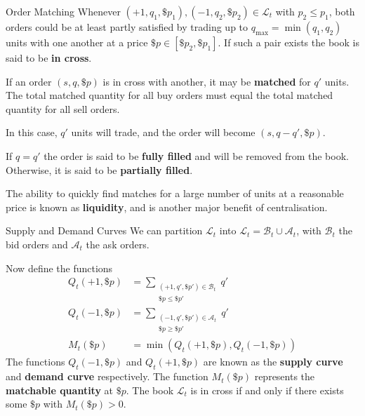 \documentclass{beamer}
\begin{document}
\begin{frame}{Order Matching}
	Whenever $(+1,q_1,\$p_1), (-1,q_2,\$p_2)\in\mathcal{L}_t$ with $p_2\leq p_1$, both orders could be at least partly satisfied by trading up to $q_{\max}=\min(q_1,q_2)$ units with one another at a price $\$p\in[\$p_2,\$p_1]$. If such a pair exists the book is said to be \textbf{in cross}.

	\pause

	If an order $(s,q,\$p)$ is in cross with another, it may be \textbf{matched} for $q'$ units. The total matched quantity for all buy orders must equal the total matched quantity for all sell orders.

	\pause

	In this case, $q'$ units will trade, and the order will become $(s,q-q',\$p)$.

	\pause

	If $q=q'$ the order is said to be \textbf{fully filled} and will be removed from the book. Otherwise, it is said to be \textbf{partially filled}.

	\pause
	The ability to quickly find matches for a large number of units at a reasonable price is known as \textbf{liquidity}, and is another major benefit of centralisation.
\end{frame}

\begin{frame}{Supply and Demand Curves}
	We can partition $\mathcal{L}_t$ into $\mathcal{L}_t = \mathcal{B}_t\cup\mathcal{A}_t$, with $\mathcal{B}_t$ the bid orders and $\mathcal{A}_t$ the ask orders.

	\pause

	Now define the functions
	\begin{align*}
		Q_t(+1,\$p)	&= \sum_{\substack{(+1,q',\$p') \in \mathcal{B}_t \\ \$p\leq \$p'}} q'
	\\	Q_t(-1,\$p)	&= \sum_{\substack{(-1,q',\$p') \in \mathcal{A}_t \\ \$p\geq \$p'}} q'
	\\	M_t(\$p)	&= \min(Q_t(+1,\$p),Q_t(-1,\$p))
	\end{align*}
	\pause
	The functions $Q_t(-1,\$p)$ and $Q_t(+1,\$p)$ are known as the \textbf{supply curve} and \textbf{demand curve} respectively. The function $M_t(\$p)$ represents the \textbf{matchable quantity} at $\$p$.
	\pause
	The book $\mathcal{L}_t$ is in cross if and only if there exists some $\$p$ with $M_t(\$p)>0$.
\end{frame}
\end{document}
